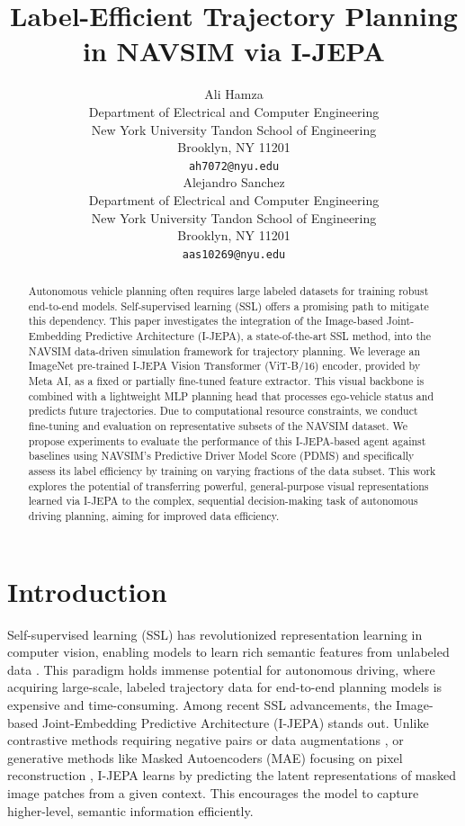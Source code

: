 \documentclass{article}
\title{Label-Efficient Trajectory Planning in NAVSIM via I-JEPA}
\author{%
  Ali Hamza \\
  Department of Electrical and Computer Engineering \\
  New York University Tandon School of Engineering \\
  Brooklyn, NY 11201 \\
  \texttt{ah7072@nyu.edu} \\
  \And
  Alejandro Sanchez \\
  Department of Electrical and Computer Engineering \\
  New York University Tandon School of Engineering \\
  Brooklyn, NY 11201 \\
  \texttt{aas10269@nyu.edu} \\ %
}
\begin{document}
\maketitle

\begin{abstract}
Autonomous vehicle planning often requires large labeled datasets for training robust end-to-end models. Self-supervised learning (SSL) offers a promising path to mitigate this dependency. This paper investigates the integration of the Image-based Joint-Embedding Predictive Architecture (I-JEPA), a state-of-the-art SSL method, into the NAVSIM data-driven simulation framework for trajectory planning. We leverage an ImageNet pre-trained I-JEPA Vision Transformer (ViT-B/16) encoder, provided by Meta AI, as a fixed or partially fine-tuned feature extractor. This visual backbone is combined with a lightweight MLP planning head that processes ego-vehicle status and predicts future trajectories. Due to computational resource constraints, we conduct fine-tuning and evaluation on representative subsets of the NAVSIM dataset. We propose experiments to evaluate the performance of this I-JEPA-based agent against baselines using NAVSIM's Predictive Driver Model Score (PDMS) and specifically assess its label efficiency by training on varying fractions of the data subset. This work explores the potential of transferring powerful, general-purpose visual representations learned via I-JEPA to the complex, sequential decision-making task of autonomous driving planning, aiming for improved data efficiency.
\end{abstract}

\section{Introduction}
Self-supervised learning (SSL) has revolutionized representation learning in computer vision, enabling models to learn rich semantic features from unlabeled data \cite{chen2020simple, grill2020bootstrap, he2022mae, assran2023ijepa}. This paradigm holds immense potential for autonomous driving, where acquiring large-scale, labeled trajectory data for end-to-end planning models is expensive and time-consuming. Among recent SSL advancements, the Image-based Joint-Embedding Predictive Architecture (I-JEPA) \cite{assran2023ijepa} stands out. Unlike contrastive methods requiring negative pairs or data augmentations \cite{chen2020simple, grill2020bootstrap}, or generative methods like Masked Autoencoders (MAE) focusing on pixel reconstruction \cite{he2022mae}, I-JEPA learns by predicting the latent representations of masked image patches from a given context. This encourages the model to capture higher-level, semantic information efficiently.
\end{document}
